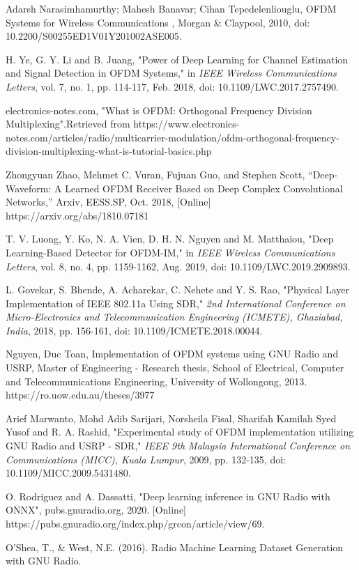 \documentclass[conference]{IEEEtran}
\begin{document}
\begin{thebibliography}{00}

Adarsh Narasimhamurthy; Mahesh Banavar; Cihan Tepedelenliouglu, OFDM Systems for Wireless Communications , Morgan \& Claypool, 2010, doi: 10.2200/S00255ED1V01Y201002ASE005.

H. Ye, G. Y. Li and B. Juang, "Power of Deep Learning for Channel Estimation and Signal Detection in OFDM Systems," in \textit{IEEE Wireless Communications Letters}, vol. 7, no. 1, pp. 114-117, Feb. 2018, doi: 10.1109/LWC.2017.2757490.

electronics-notes.com, "What is OFDM: Orthogonal Frequency Division Multiplexing".Retrieved from https://www.electronics-notes.com/articles/radio/multicarrier-modulation/ofdm-orthogonal-frequency-division-multiplexing-what-is-tutorial-basics.php

 Zhongyuan Zhao, Mehmet C. Vuran, Fujuan Guo, and Stephen Scott, “Deep-Waveform: A Learned OFDM Receiver Based on Deep Complex Convolutional Networks,” Arxiv, EESS.SP, Oct. 2018, [Online] https://arxiv.org/abs/1810.07181

T. V. Luong, Y. Ko, N. A. Vien, D. H. N. Nguyen and M. Matthaiou, "Deep Learning-Based Detector for OFDM-IM," in \textit{IEEE Wireless Communications Letters}, vol. 8, no. 4, pp. 1159-1162, Aug. 2019, doi: 10.1109/LWC.2019.2909893.

L. Govekar, S. Bhende, A. Acharekar, C. Nehete and Y. S. Rao, "Physical Layer Implementation of IEEE 802.11a Using SDR," \textit{2nd International Conference on Micro-Electronics and Telecommunication Engineering (ICMETE), Ghaziabad, India}, 2018, pp. 156-161, doi: 10.1109/ICMETE.2018.00044.

 Nguyen, Duc Toan, Implementation of OFDM systems using GNU Radio and USRP, Master of Engineering - Research thesis, School of Electrical, Computer and Telecommunications Engineering, University of Wollongong, 2013. https://ro.uow.edu.au/theses/3977

 Arief Marwanto, Mohd Adib Sarijari, Norsheila Fisal, Sharifah Kamilah Syed Yusof and R. A. Rashid, "Experimental study of OFDM implementation utilizing GNU Radio and USRP - SDR," \textit{IEEE 9th Malaysia International Conference on Communications (MICC), Kuala Lumpur}, 2009, pp. 132-135, doi: 10.1109/MICC.2009.5431480.

O. Rodriguez and A. Dassatti, "Deep learning inference in GNU Radio with ONNX", pubs.gnuradio.org, 2020. [Online] https://pubs.gnuradio.org/index.php/grcon/article/view/69.

 O'Shea, T., \& West, N.E. (2016). Radio Machine Learning Dataset Generation with GNU Radio.

\end{thebibliography}
\end{document}
